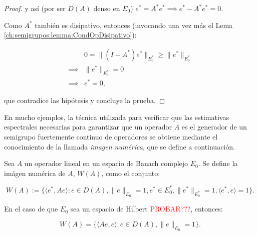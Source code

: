 \begin{proof}
    y así (por ser $D(A)$ denso en $E_0$) $e^* = A^* e^* \implies e^* - A^*e^* = 0$.

    Como $A^*$ también es disipativo, entonces (invocando una vez más el Lema \ref{ch:semigrupos:lemma:CondOpDisipativo}):

    \begin{align*}
    &0 = \lVert (I - A^*)e^* \rVert_{E^*_0} \geq \lVert e^* \rVert_{E_0^*}\\
    \implies& \lVert e^* \rVert_{E_0^*} = 0\\
    \implies& e^* = 0,
    \end{align*}

    que contradice las hipótesis y concluye la prueba.
\end{proof}

En mucho ejemplos, la técnica utilizada para verificar que las estimativas espectrales necesarias para garantizar que un operador $A$ es el generador de un semigrupo fuertemente continuo de operadores se obtiene mediante el conocimiento de la llamada \textit{imagen numérica}, que se define a continuación.

\begin{Definicion}
    \label{ch:semigrupos:def:imgNumerica}

    Sea $A$ un operador lineal en un espacio de Banach complejo $E_0$. Se define la imágen numérica de $A$, $W(A)$, como el conjunto:

    \[W(A) := \Big \{\langle e^*, Ae \rangle : e \in D(A), \lVert e \rVert_{E_0} = 1, e^* \in E_0^*, \lVert e^* \rVert_{E_0^*} = 1, \langle e^*, e \rangle = 1  \Big \}.\]

    En el caso de que $E_0$ sea un espacio de Hilbert \textcolor{red}{PROBAR???}, entonces:

    \[W(A) = \Big \{\langle Ae, e\rangle : e \in D(A), \lVert e \rVert_{E_0} = 1 \Big \}.\]
\end{Definicion}


